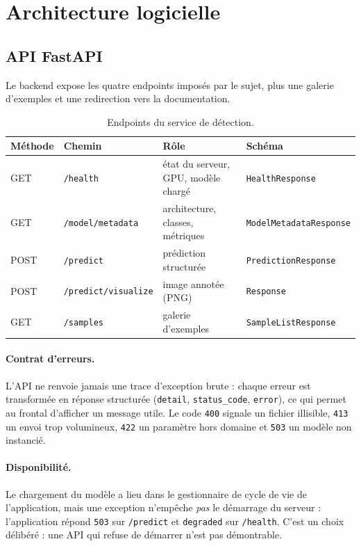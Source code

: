 \documentclass[11pt,a4paper]{article}
\begin{document}
\section{Architecture logicielle}

\subsection{API FastAPI}

Le backend expose les quatre endpoints imposés par le sujet, plus une
galerie d'exemples et une redirection vers la documentation.

\begin{table}[H]
\centering
\caption{Endpoints du service de détection.}
\begin{tabular}{@{}p{1.7cm}p{4.3cm}p{4.0cm}p{4.4cm}@{}}
\toprule
\textbf{Méthode} & \textbf{Chemin} & \textbf{Rôle} & \textbf{Schéma} \\
\midrule
GET  & \texttt{/health}            & état du serveur, GPU, modèle chargé & \texttt{HealthResponse} \\
GET  & \texttt{/model/metadata}    & architecture, classes, métriques & \texttt{ModelMetadataResponse} \\
POST & \texttt{/predict}           & prédiction structurée & \texttt{PredictionResponse} \\
POST & \texttt{/predict/visualize} & image annotée (PNG) & \texttt{Response} \\
GET  & \texttt{/samples}           & galerie d'exemples & \texttt{SampleListResponse} \\
\bottomrule
\end{tabular}
\end{table}

\paragraph{Contrat d'erreurs.} L'API ne renvoie jamais une trace d'exception
brute : chaque erreur est transformée en réponse structurée
(\texttt{detail}, \texttt{status\_code}, \texttt{error}), ce qui permet au
frontal d'afficher un message utile. Le code \texttt{400} signale un
fichier illisible, \texttt{413} un envoi trop volumineux, \texttt{422} un
paramètre hors domaine et \texttt{503} un modèle non instancié.

\paragraph{Disponibilité.} Le chargement du modèle a lieu dans le
gestionnaire de cycle de vie de l'application, mais une exception n'empêche
\emph{pas} le démarrage du serveur : l'application répond \texttt{503} sur
\texttt{/predict} et \texttt{degraded} sur \texttt{/health}. C'est un choix
délibéré : une API qui refuse de démarrer n'est pas démontrable.
\end{document}
